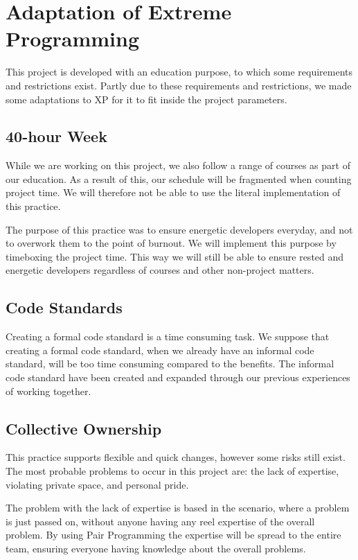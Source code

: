 \section{Adaptation of Extreme Programming}
This project is developed with an education purpose, to which some requirements and restrictions exist.
Partly due to these requirements and restrictions, we made some adaptations to XP for it to fit inside the project parameters.

\subsection{40-hour Week}
While we are working on this project, we also follow a range of courses as part of our education.
As a result of this, our schedule will be fragmented when counting project time.
We will therefore not be able to use the literal implementation of this practice.

The purpose of this practice was to ensure energetic developers everyday, and not to overwork them to the point of burnout.
We will implement this purpose by timeboxing the project time.
This way we will still be able to ensure rested and energetic developers regardless of courses and other non-project matters.

\subsection{Code Standards}
Creating a formal code standard is a time consuming task.
We suppose that creating a formal code standard, when we already have an informal code standard, will be too time consuming compared to the benefits.
The informal code standard have been created and expanded through our previous experiences of working together.

\subsection{Collective Ownership}
This practice supports flexible and quick changes, however some risks still exist.
The most probable problems to occur in this project are: the lack of expertise, violating private space, and personal pride.

The problem with the lack of expertise is based in the scenario, where a problem is just passed on, without anyone having any reel expertise of the overall problem.
By using Pair Programming the expertise will be spread to the entire team, ensuring everyone having knowledge about the overall problems.

